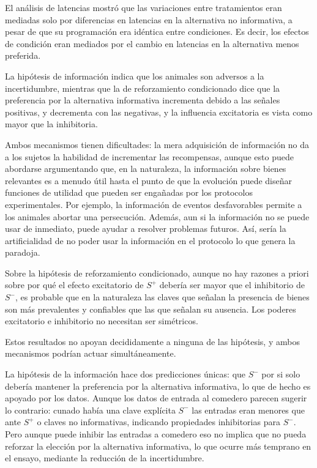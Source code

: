 \documentclass[a4paper,12pt]{article}
\begin{document}
El análisis de latencias mostró que las variaciones entre tratamientos eran mediadas solo por diferencias en latencias en la alternativa no informativa, a pesar de que su programación era idéntica entre condiciones. Es decir, los efectos de condición eran mediados por el cambio en latencias en la alternativa menos preferida.

La hipótesis de información indica que los animales son adversos a la incertidumbre, mientras que la de reforzamiento condicionado dice que la preferencia por la alternativa informativa incrementa debido a las señales positivas, y decrementa con las negativas, y la influencia excitatoria es vista como mayor que la inhibitoria.

Ambos mecanismos tienen dificultades: la mera adquisición de información no da a los sujetos la habilidad de incrementar las recompensas, aunque esto puede abordarse argumentando que, en la naturaleza, la información sobre bienes relevantes es a menudo útil hasta el punto de que la evolución puede diseñar funciones de utilidad que pueden ser engañadas por los protocolos experimentales. Por ejemplo, la información de eventos desfavorables permite a los animales abortar una persecución. Además, aun si la información no se puede usar de inmediato, puede ayudar a resolver problemas futuros. Así, sería la artificialidad de no poder usar la información en el protocolo lo que genera la paradoja.

Sobre la hipótesis de reforzamiento condicionado, aunque no hay razones a priori sobre por qué el efecto excitatorio de $S^{+}$ debería ser mayor que el inhibitorio de $S^{-}$, es probable que en la naturaleza las claves que señalan la presencia de bienes son más prevalentes y confiables que las que señalan su ausencia. Los poderes excitatorio e inhibitorio no necesitan ser simétricos.

Estos resultados no apoyan decididamente a ninguna de las hipótesis, y ambos mecanismos podrían actuar simultáneamente.

La hipótesis de la información hace dos predicciones únicas: que $S^{-}$ por si solo debería mantener la preferencia por la alternativa informativa, lo que de hecho es apoyado por los datos. Aunque los datos de entrada al comedero parecen sugerir lo contrario: cunado había una clave explícita $S^{-}$ las entradas eran menores que ante $S^{+}$ o claves no informativas, indicando propiedades inhibitorias para $S^{-}$. Pero aunque puede inhibir las entradas a comedero eso no implica que no pueda reforzar la elección por la alternativa informativa, lo que ocurre más temprano en el ensayo, mediante la reducción de la incertidumbre.
\end{document}
